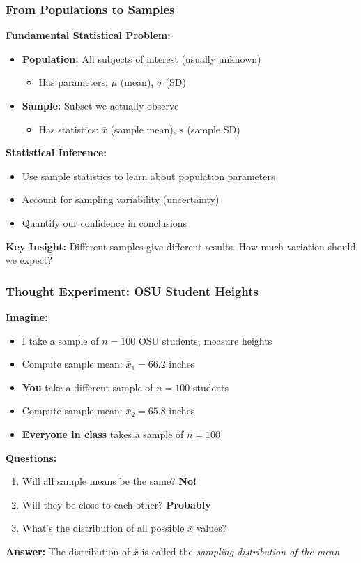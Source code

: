 \documentclass{beamer}
\begin{document}
\begin{frame}
\frametitle{From Populations to Samples}
\textbf{Fundamental Statistical Problem:}
\begin{itemize}
\item \textbf{Population:} All subjects of interest (usually unknown)
  \begin{itemize}
  \item Has parameters: $\mu$ (mean), $\sigma$ (SD)
  \end{itemize}
\item \textbf{Sample:} Subset we actually observe
  \begin{itemize}
  \item Has statistics: $\bar{x}$ (sample mean), $s$ (sample SD)
  \end{itemize}
\end{itemize}

\vspace{0.5cm}
\textbf{Statistical Inference:}
\begin{itemize}
\item Use sample statistics to learn about population parameters
\item Account for sampling variability (uncertainty)
\item Quantify our confidence in conclusions
\end{itemize}

\vspace{0.5cm}
\textbf{Key Insight:} Different samples give different results. How much variation should we expect?
\end{frame}

\begin{frame}
\frametitle{Thought Experiment: OSU Student Heights}
\textbf{Imagine:}
\begin{itemize}
\item I take a sample of $n=100$ OSU students, measure heights
\item Compute sample mean: $\bar{x}_1 = 66.2$ inches
\item \textbf{You} take a different sample of $n=100$ students
\item Compute sample mean: $\bar{x}_2 = 65.8$ inches
\item \textbf{Everyone in class} takes a sample of $n=100$
\end{itemize}

\vspace{0.5cm}
\textbf{Questions:}
\begin{enumerate}
\item Will all sample means be the same? \textbf{No!}
\item Will they be close to each other? \textbf{Probably}
\item What's the distribution of all possible $\bar{x}$ values?
\end{enumerate}

\vspace{0.3cm}
\textbf{Answer:} The distribution of $\bar{x}$ is called the \textit{sampling distribution of the mean}
\end{frame}
\end{document}

